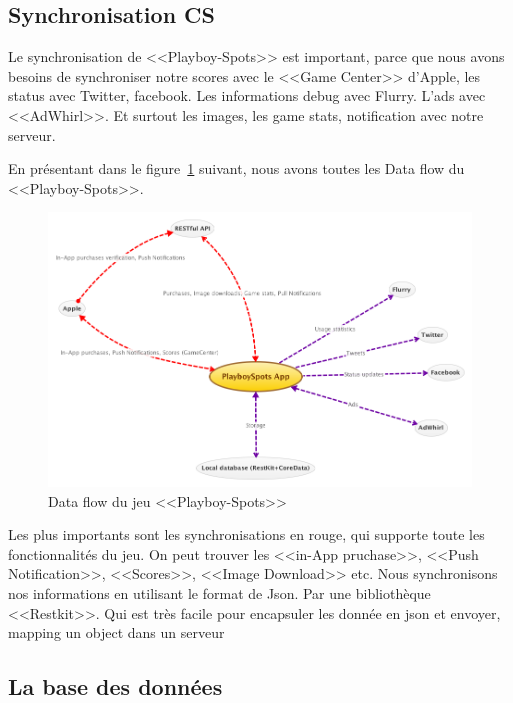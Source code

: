 

\subsection{Synchronisation CS} %

Le synchronisation de <<Playboy-Spots>> est important, parce que nous avons besoins de synchroniser notre scores avec le <<Game Center>> d'Apple, les status avec Twitter, facebook. Les informations debug avec Flurry. L'ads avec <<AdWhirl>>. Et surtout les images, les game stats, notification avec notre serveur.

En présentant dans le figure~\ref{fig:XMinds_DataFlow} suivant, nous avons toutes les Data flow du <<Playboy-Spots>>.

\begin{figure}[htbp]
	\centering
		\includegraphics[width=7in]{XMinds/DataFlow.png}
	\caption{Data flow du jeu <<Playboy-Spots>>}
	\label{fig:XMinds_DataFlow}
\end{figure}

Les plus importants sont les synchronisations en rouge, qui supporte toute les fonctionnalités du jeu. On peut trouver les <<in-App pruchase>>, <<Push Notification>>, <<Scores>>, <<Image Download>> etc.
Nous synchronisons nos informations en utilisant le format de Json. Par une bibliothèque <<Restkit>>. Qui est très facile pour encapsuler les donnée en json et envoyer, mapping un object dans un serveur  


\subsection{La base des données} %

